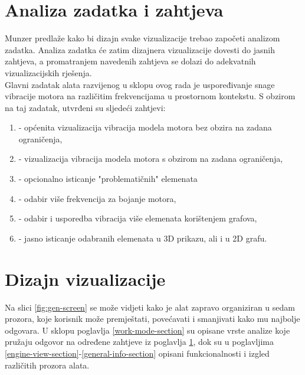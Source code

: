 \documentclass[times, utf8, diplomski]{fer}
\begin{document}
\chapter{Analiza zadatka i zahtjeva} \label{reqs-section}

Munzer \citep{munzer2009} predlaže kako bi dizajn svake vizualizacije trebao započeti analizom zadatka. Analiza zadatka će zatim dizajnera vizualizacije dovesti do jasnih zahtjeva, a promatranjem navedenih zahtjeva se dolazi do adekvatnih vizualizacijskih rješenja.\\

Glavni zadatak alata razvijenog u sklopu ovog rada je uspoređivanje snage vibracije motora na različitim frekvencijama u prostornom kontekstu. S obzirom na taj zadatak, utvrđeni su sljedeći zahtjevi: 

\begin{enumerate}[label=Z\arabic*]
\item \label{req:general-vis} - općenita vizualizacija vibracija modela motora bez obzira na zadana ograničenja,
\item \label{req:limited-vis} - vizualizacija vibracija modela motora s obzirom na zadana ograničenja,
\item \label{req:cell-emphasis} - opcionalno isticanje "problematičnih" elemenata
\item \label{req:multi-freq} - odabir više frekvencija za bojanje motora,
\item \label{req:multi-cell} - odabir i usporedba vibracija više elemenata korištenjem grafova,
\item \label{req:selected-cell-emp} - jasno isticanje odabranih elemenata u 3D prikazu, ali i u 2D grafu.
\end{enumerate}

\chapter{Dizajn vizualizacije}

Na slici \ref{fig:gen-screen} se može vidjeti kako je alat zapravo organiziran u sedam prozora, koje korisnik može premještati, povećavati i smanjivati kako mu najbolje odgovara. U sklopu poglavlja \ref{work-mode-section} su opisane vrste analize koje pružaju odgovor na određene zahtjeve iz poglavlja \ref{reqs-section}, dok su u poglavljima \ref{engine-view-section}-\ref{general-info-section} opisani funkcionalnosti i izgled različitih prozora alata.
\end{document}
